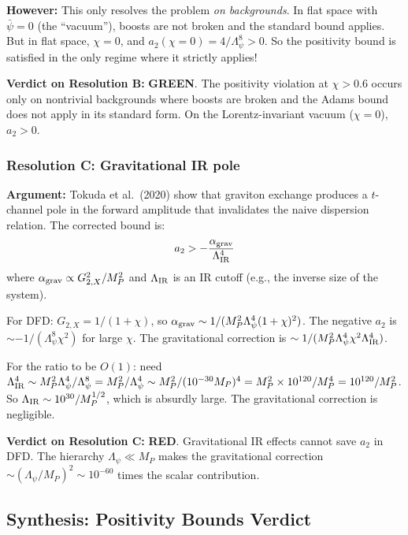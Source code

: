 \documentclass[11pt,a4paper]{article}
\newcommand{\GREEN}{\textcolor{dfdgreen}{\textbf{GREEN}}}
\newcommand{\RED}{\textcolor{dfdred}{\textbf{RED}}}
\begin{document}
\textbf{However:} This only resolves the problem \emph{on backgrounds}. In flat space with $\bar{\psi} = 0$ (the ``vacuum''), boosts are not broken and the standard bound applies. But in flat space, $\chi = 0$, and $a_2(\chi=0) = 4/\Lambda_\psi^8 > 0$. So the positivity bound is satisfied in the only regime where it strictly applies!

\textbf{Verdict on Resolution B:} \GREEN. The positivity violation at $\chi > 0.6$ occurs only on nontrivial backgrounds where boosts are broken and the Adams bound does not apply in its standard form. On the Lorentz-invariant vacuum ($\chi = 0$), $a_2 > 0$.

\subsubsection{Resolution C: Gravitational IR pole}

\textbf{Argument:} Tokuda et al.\ (2020) show that graviton exchange produces a $t$-channel pole in the forward amplitude that invalidates the naive dispersion relation. The corrected bound is:
\begin{equation}
a_2 > -\frac{\alpha_{\rm grav}}{\Lambda_{\rm IR}^4}
\end{equation}
where $\alpha_{\rm grav} \propto G_{2,X}^2/M_P^2$ and $\Lambda_{\rm IR}$ is an IR cutoff (e.g., the inverse size of the system).

For DFD: $G_{2,X} = 1/(1+\chi)$, so $\alpha_{\rm grav} \sim 1/(M_P^2\Lambda_\psi^4(1+\chi)^2)$. The negative $a_2$ is $\sim -1/(\Lambda_\psi^8\chi^2)$ for large $\chi$. The gravitational correction is $\sim 1/(M_P^2\Lambda_\psi^4 \chi^2\Lambda_{\rm IR}^4)$.

For the ratio to be $O(1)$: need $\Lambda_{\rm IR}^4 \sim M_P^2\Lambda_\psi^4/\Lambda_\psi^8 = M_P^2/\Lambda_\psi^4 \sim M_P^2/(10^{-30}M_P)^4 = M_P^2 \times 10^{120}/M_P^4 = 10^{120}/M_P^2$. So $\Lambda_{\rm IR} \sim 10^{30}/M_P^{1/2}$, which is absurdly large. The gravitational correction is negligible.

\textbf{Verdict on Resolution C:} \RED. Gravitational IR effects cannot save $a_2$ in DFD. The hierarchy $\Lambda_\psi \ll M_P$ makes the gravitational correction $\sim (\Lambda_\psi/M_P)^2 \sim 10^{-60}$ times the scalar contribution.

\subsection{Synthesis: Positivity Bounds Verdict}
\end{document}
